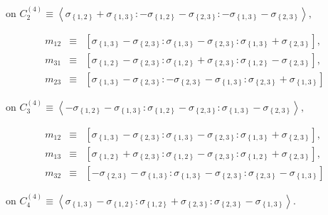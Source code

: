 \documentclass[11pt]{article}
\begin{document}
on $C_{2}^{\left( 4\right) }\equiv \left\langle \sigma _{\left\{ 1,2\right\}
}+\sigma _{\left\{ 1,3\right\} }:-\sigma _{\left\{ 1,2\right\} }-\sigma
_{\left\{ 2,3\right\} }:-\sigma _{\left\{ 1,3\right\} }-\sigma _{\left\{
2,3\right\} }\right\rangle ,$

\begin{eqnarray*}
m_{12} &\equiv &\left[ \sigma _{\left\{ 1,3\right\} }-\sigma _{\left\{
2,3\right\} }:\sigma _{\left\{ 1,3\right\} }-\sigma _{\left\{ 2,3\right\}
}:\sigma _{\left\{ 1,3\right\} }+\sigma _{\left\{ 2,3\right\} }\right] , \\
m_{31} &\equiv &\left[ \sigma _{\left\{ 1,2\right\} }-\sigma _{\left\{
2,3\right\} }:\sigma _{\left\{ 1,2\right\} }+\sigma _{\left\{ 2,3\right\}
}:\sigma _{\left\{ 1,2\right\} }-\sigma _{\left\{ 2,3\right\} }\right] , \\
m_{23} &\equiv &\left[ \sigma _{\left\{ 1,3\right\} }-\sigma _{\left\{
2,3\right\} }:-\sigma _{\left\{ 2,3\right\} }-\sigma _{\left\{ 1,3\right\}
}:\sigma _{\left\{ 2,3\right\} }+\sigma _{\left\{ 1,3\right\} }\right] 
\end{eqnarray*}

on $C_{3}^{\left( 4\right) }\equiv \left\langle -\sigma _{\left\{
1,2\right\} }-\sigma _{\left\{ 1,3\right\} }:\sigma _{\left\{ 1,2\right\}
}-\sigma _{\left\{ 2,3\right\} }:\sigma _{\left\{ 1,3\right\} }-\sigma
_{\left\{ 2,3\right\} }\right\rangle ,$

\begin{eqnarray*}
m_{12} &\equiv &\left[ \sigma _{\left\{ 1,3\right\} }-\sigma _{\left\{
2,3\right\} }:\sigma _{\left\{ 1,3\right\} }-\sigma _{\left\{ 2,3\right\}
}:\sigma _{\left\{ 1,3\right\} }+\sigma _{\left\{ 2,3\right\} }\right] , \\
m_{13} &\equiv &\left[ \sigma _{\left\{ 1,2\right\} }+\sigma _{\left\{
2,3\right\} }:\sigma _{\left\{ 1,2\right\} }-\sigma _{\left\{ 2,3\right\}
}:\sigma _{\left\{ 1,2\right\} }+\sigma _{\left\{ 2,3\right\} }\right] , \\
m_{32} &\equiv &\left[ -\sigma _{\left\{ 2,3\right\} }-\sigma _{\left\{
1,3\right\} }:\sigma _{\left\{ 1,3\right\} }-\sigma _{\left\{ 2,3\right\}
}:\sigma _{\left\{ 2,3\right\} }-\sigma _{\left\{ 1,3\right\} }\right] 
\end{eqnarray*}

on $C_{4}^{\left( 4\right) }\equiv \left\langle \sigma _{\left\{ 1,3\right\}
}-\sigma _{\left\{ 1,2\right\} }:\sigma _{\left\{ 1,2\right\} }+\sigma
_{\left\{ 2,3\right\} }:\sigma _{\left\{ 2,3\right\} }-\sigma _{\left\{
1,3\right\} }\right\rangle .$
\end{document}
